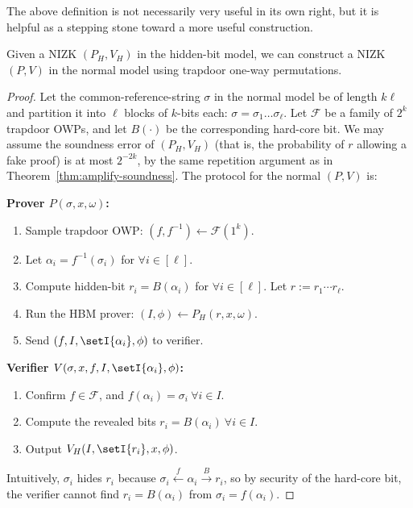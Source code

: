 \documentclass[12pt]{tufte-book}
\begin{document}
The above definition is not necessarily very useful in its own right, but it is helpful as a stepping stone toward a more useful construction.

\begin{theorem}\label{thm:NIZK-amplify}
    Given a NIZK $(P_H, V_H)$ in the hidden-bit model, we can construct a NIZK
    $(P, V)$ in the normal model using trapdoor one-way permutations.
\end{theorem}
\begin{proof}
    Let the common-reference-string $\sigma$ in the normal model be of length $k\ell$ and  partition it
    into $\ell$ blocks of $k$-bits each: $\sigma = \sigma_1\hdots\sigma_\ell$.
    Let $\mathcal{F}$ be a family of $2^k$ trapdoor OWPs, and let $B(\cdot)$
    be the corresponding hard-core bit. We may assume the soundness error
    of $(P_H, V_H)$
    (that is, the probability of $r$ allowing a fake proof)
    is at most $2^{-2k}$, by the same repetition argument as in Theorem~\ref{thm:amplify-soundness}.
    The protocol for the normal $(P, V)$ is:

\medskip
\noindent \textbf{Prover $P(\sigma, x, \omega)$:}
\begin{enumerate}
    \item Sample trapdoor OWP: $(f, f^{-1}) \gets \mathcal{F}(1^k)$.
    \item Let $\alpha_i = f^{-1}(\sigma_i)$ for $\forall i \in [\ell]$.
    \item Compute hidden-bit $r_i = B(\alpha_i)$ for $\forall i \in [\ell]$. Let $r := r_1 \cdots r_\ell$.
    \item Run the HBM prover: $(I, \phi) \gets P_H(r, x, \omega)$.
    \item Send $(f, I, \setI{\alpha_i}, \phi)$ to verifier.
\end{enumerate}

\noindent \textbf{Verifier $V(\sigma, x, f, I, \setI{\alpha_i}, \phi)$:}
\begin{enumerate}
    \item Confirm $f \in \mathcal{F}$, and $f(\alpha_i) = \sigma_i ~\forall i \in I$.
    \item Compute the revealed bits $r_i = B(\alpha_i) ~\forall i \in I$.
    \item Output $V_H(I, \setI{r_i}, x, \phi)$.
\end{enumerate}

Intuitively, $\sigma_i$ hides $r_i$ because $\sigma_i \overset{f}{\gets} \alpha_i
\overset{B}{\to} r_i$, so by security of the hard-core bit, the verifier cannot
find $r_i = B(\alpha_i)$ from $\sigma_i = f(\alpha_i)$.


\end{proof}
\end{document}
